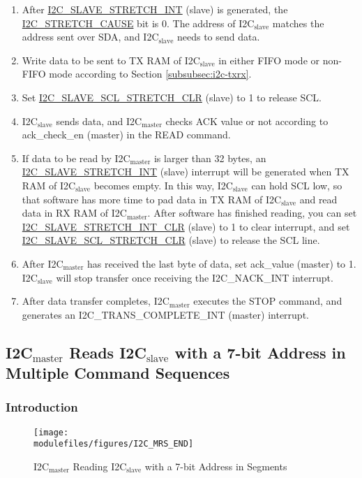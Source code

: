 \documentclass[main\_\_EN.tex]{subfiles}
\begin{document}
\begin{enumerate}
\item After \hyperref[int:i2c-slave-stretch]{I2C\_SLAVE\_STRETCH\_INT} (slave) is generated, the \hyperref[fielddesc:I2CSTRETCHCAUSE]{I2C\_STRETCH\_CAUSE} bit is 0. The address of I2C$_\text{slave}$ matches the address sent over SDA, and I2C$_\text{slave}$ needs to send data.

\item Write data to be sent to TX RAM of I2C$_\text{slave}$ in either FIFO mode or non-FIFO mode according to Section \ref{subsubsec:i2c-txrx}.
\item Set \hyperref[fielddesc:I2CSLAVESCLSTRETCHCLR]{I2C\_SLAVE\_SCL\_STRETCH\_CLR} (slave) to 1 to release SCL.


\item I2C$_\text{slave}$ sends data, and I2C$_\text{master}$ checks ACK value or not according to ack\_check\_en (master) in the READ command.
\item If data to be read by I2C$_\text{master}$ is larger than 32 bytes, an \hyperref[int:i2c-slave-stretch]{I2C\_SLAVE\_STRETCH\_INT} (slave) interrupt will be generated when TX RAM of I2C$_\text{slave}$ becomes empty. In this way, I2C$_\text{slave}$ can hold SCL low, so that software has more time to pad data in TX RAM of I2C$_\text{slave}$ and read data in RX RAM of I2C$_\text{master}$. After software has finished reading, you can set \hyperref[fielddesc:I2CSLAVESTRETCHINTCLR]{I2C\_SLAVE\_STRETCH\_INT\_CLR} (slave) to 1 to clear interrupt, and set \hyperref[fielddesc:I2CSLAVESCLSTRETCHCLR]{I2C\_SLAVE\_SCL\_STRETCH\_CLR} (slave) to release the SCL line.

\item After I2C$_\text{master}$ has received the last byte of data, set ack\_value (master) to 1. I2C$_\text{slave}$ will stop transfer once receiving the I2C\_NACK\_INT interrupt.

\item After data transfer completes, I2C$_\text{master}$ executes the STOP command, and generates an I2C\_TRANS\_COMPLETE\_INT (master) interrupt.
\end{enumerate}


\subsection{\texorpdfstring{I2C$_\text{master}$ Reads I2C$_\text{slave}$ with a 7-bit Address in Multiple Command Sequences}{I2C master Reads I2C slave with a 7-bit Address in Multiple Command Sequences}}
\subsubsection{Introduction}
\begin{figure}[H]
    \centering
    \texttt{[image: \\modulefiles/figures/I2C\_MRS\_END]}
    \caption{I2C$_\text{master}$ Reading I2C$_\text{slave}$ with a 7-bit Address in Segments}
    \label{fig:i2c-mrs7-multiple}
\end{figure}
\end{document}
